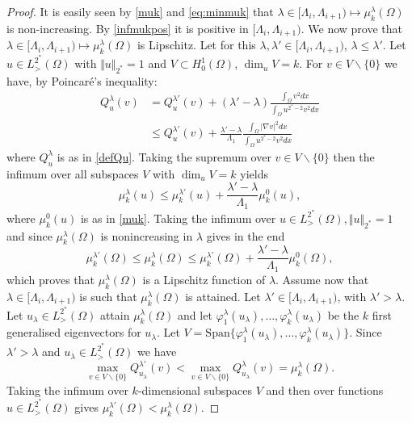 \documentclass[10pt]{amsart}
\numberwithin{equation}{section}
\newcommand{\vp}{\varphi}
\newcommand{\Om}{\Omega}
\newcommand{\mkl}{\mu_{k}^{\lambda}}
\newcommand{\vkl}{\varphi_{k}^{\lambda}}
\theoremstyle{plain}
\theoremstyle{remark}
\begin{document}
\begin{proof}
 It is easily seen by \eqref{muk} and \eqref{eq:minmuk} that $\lambda \in [\Lambda_i, \Lambda_{i+1}) \mapsto \mkl(\Om)$ is non-increasing. By \eqref{infmukpos} it is positive in  $[\Lambda_i, \Lambda_{i+1})$. We now prove that $\lambda \in [\Lambda_i, \Lambda_{i+1}) \mapsto \mkl(\Om)$ is Lipschitz. Let for this $\lambda, \lambda' \in   [\Lambda_i, \Lambda_{i+1})$, $\lambda \le \lambda'$. Let $u \in L^{2^*}_{>}(\Om)$ with $\Vert u \Vert_{2^*} =1$ and $V\subset H^1_0(\Om)$, $\dim_u V = k$. For $v \in V \backslash \{0\}$ we have, by Poincar\'e's inequality:
$$  \begin{aligned}
 Q_u^{\lambda}(v)  & = Q_u^{\lambda'}(v)  + (\lambda'-\lambda) \frac{\int_{\Om} v^2 dx}{\int_{\Om} u^{2^*-2}v^2dx} \\
 & \le Q_u^{\lambda'}(v)  + \frac{\lambda'-\lambda}{\Lambda_1} \frac{\int_{\Om} |\nabla v|^2 dx}{\int_{\Om} u^{2^*-2}v^2dx}
\end{aligned} $$
where $Q_u^{\lambda}$ is as in \eqref{defQu}. Taking the supremum over $v \in V \backslash \{0\}$ then the infimum over all subspaces $V$ with $\dim_u V = k$ yields 
$$ \mkl(u) \le \mu_k^{\lambda'}(u) +  \frac{\lambda'-\lambda}{\Lambda_1} \mu_k^{0}(u), $$
where $\mu_k^{0}(u)$ is as in \eqref{muk}. Taking the infimum over $u \in L^{2^*}_{>}(\Om), \Vert u \Vert_{2^*} = 1$ and since $\mkl(\Om)$ is nonincreasing in $\lambda$ gives in the end 
\begin{equation} \label{croissance:muk}
  \mu_k^{\lambda'}(\Om) \le \mkl(\Om) \le \mu_k^{\lambda'}(\Om) +  \frac{\lambda'-\lambda}{\Lambda_1} \mu_k^{0}(\Om), 
  \end{equation}
which proves that $\mkl(\Om)$ is a Lipschitz function of $\lambda$. Assume now that $ \lambda \in [\Lambda_i, \Lambda_{i+1})$ is such that  $\mkl(\Om)$ is attained. Let $\lambda' \in [\Lambda_i, \Lambda_{i+1})$, with $\lambda' > \lambda$. Let $u_\lambda \in L^{2^*}_{>}(\Om)$ attain $\mkl(\Om)$ and let $\vp_1^{\lambda}(u_\lambda), \dots, \vkl(u_{\lambda})$ be the $k$ first generalised eigenvectors for $u_\lambda$. Let $V = \text{Span}\{\vp_1^{\lambda}(u_\lambda), \dots, \vkl(u_{\lambda})\}$. Since $\lambda' > \lambda$ and $u_\lambda \in L^{2^*}_{>}(\Om)$ we have 
$$ \max_{v \in V \backslash \{0\}} Q_{u_\lambda}^{\lambda'}(v) < \max_{v \in V \backslash \{0\}} Q_{u_\lambda}^{\lambda}(v) = \mkl(\Om) .$$
Taking the infimum over $k$-dimensional subspaces $V$ and then over functions $u \in L^{2^*}_{>}(\Om)$  gives $\mu_k^{\lambda'}(\Om) < \mkl(\Om)$.


\end{proof}
\end{document}
